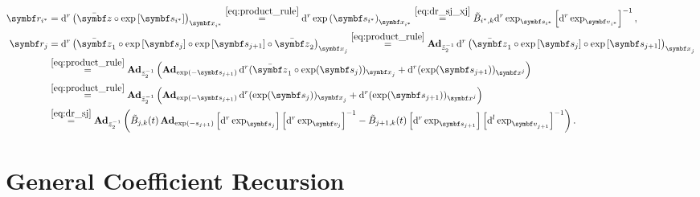 \begin{equation*}
  \begin{aligned}
    \symbf r_{i^*}
     & = \mathrm{d}^r \left( \bar \z \circ \exp \left[ \symbf s_{i^*} \right] \right)_{\x_{i^*}}
    \overset{\eqref{eq:product_rule}}= \mathrm{d}^r \exp\left( \symbf s_{i^*} \right)_{\x_{i^*}} \overset{\eqref{eq:dr_sj_xj}}=  \tilde B_{i^*, k} \mathrm{d}^r \exp_{\symbf s_{i^*}} \left[ \mathrm{d}^r \exp_{\bv_{i^*}} \right]^{-1},                                                                      \\
    \symbf r_{j}
     & = \mathrm{d}^r \left( \bar \z_1 \circ \exp \left[ \symbf s_{j} \right]\circ \exp \left[ \symbf s_{j+1} \right] \circ \bar \z_2 \right)_{\x_j}
    \overset{\eqref{eq:product_rule}}= \bAd_{\bar z_2^{-1}} \mathrm{d}^r \left( \bar \z_1 \circ \exp \left[ \symbf s_{j} \right]\circ \exp \left[ \symbf s_{j+1} \right] \right)_{\x_j}                                                                                                                                                             \\
     & \overset{\eqref{eq:product_rule}}= \bAd_{\bar z_2^{-1}} \left( \bAd_{\exp(-\symbf s_{j+1})} \mathrm{d}^r (\bar \z_1 \circ \exp(\symbf s_j))_{\x_j} + \mathrm{d}^r (\exp(\symbf s_{j+1}))_{\x^j}  \right)                                                                                                                                     \\
     & \overset{\eqref{eq:product_rule}}= \bAd_{\bar z_2^{-1}} \left( \bAd_{\exp(-\symbf s_{j+1})} \mathrm{d}^r (\exp(\symbf s_j))_{\x_j} + \mathrm{d}^r (\exp(\symbf s_{j+1}))_{\x^j}  \right)                                                                                                                                                     \\
     & \overset{\eqref{eq:dr_sj}}= \bAd_{\bar z_2^{-1}} \left( \tilde B_{j, k}(t) \bAd_{\exp(-s_{j+1})} \left[ \mathrm{d}^r \exp_{\symbf s_j} \right] \left[ \mathrm{d}^r \exp_{\symbf v_j} \right]^{-1} - \tilde B_{j+1, k}(t) \left[ \mathrm{d}^r \exp_{\symbf s_{j+1}} \right] \left[ \mathrm{d}^l \exp_{\bv_{j+1}} \right]^{-1} \right).
  \end{aligned}
\end{equation*}


\section{General Coefficient Recursion}

